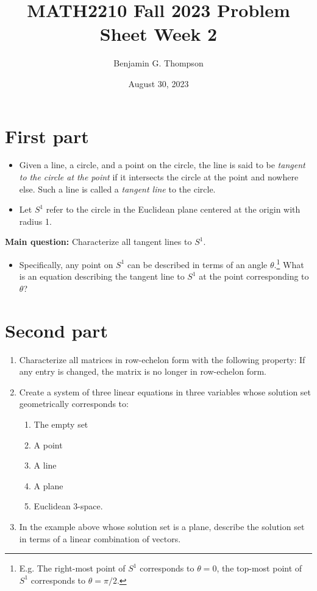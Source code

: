 \documentclass[12pt, a4paper]{article}
\title{MATH2210 Fall 2023 Problem Sheet Week 2}
\author{Benjamin G. Thompson}
\date{August 30, 2023}
\begin{document}
\section*{First part}
\begin{itemize}
\item Given a line, a circle, and a point on the circle, the line is said to be \emph{tangent to the circle at the point} if it intersects the circle at the point and nowhere else. Such a line is called a \emph{tangent line} to the circle.
\item Let $S^1$ refer to the circle in the Euclidean plane centered at the origin with radius 1.
\end{itemize}
\textbf{Main question:}
Characterize all tangent lines to $S^1$.
\begin{itemize}
  \item Specifically, any point on $S^1$ can be described in terms of an angle $\theta$.\footnote{E.g. The right-most point of $S^1$ corresponds to $\theta = 0$, the top-most point of $S^1$ corresponds to $\theta = \pi / 2$.} What is an equation describing the tangent line to $S^1$ at the point corresponding to $\theta$?
\end{itemize}

\newpage
\section*{Second part}
\begin{enumerate}
\item Characterize all matrices in row-echelon form with the following property: If any entry is changed, the matrix is no longer in row-echelon form.
\item Create a system of three linear equations in three variables whose solution set geometrically corresponds to:
  \begin{enumerate}
  \item The empty set
  \item A point
  \item A line
  \item A plane
  \item Euclidean 3-space.
  \end{enumerate}
  \item In the example above whose solution set is a plane, describe the solution set in terms of a linear combination of vectors.
\end{enumerate}
\end{document}
